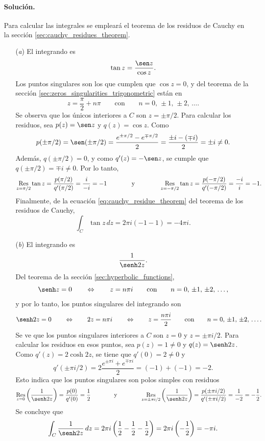 \documentclass[a4paper]{report}
\def\Res{\qopname\relax m{Res}}
\begin{document}
\paragraph{Solución.}

Para calcular las integrales se empleará el teorema de los residuos de Cauchy en la sección \ref{sec:cauchy_residues_theorem}.

\begin{enumerate}
 \item[(\textit{a})] El integrando es
 \[
  \tan z=\frac{\sen z}{\cos z}.
 \]
 Los puntos singulares son los que cumplen que \(\cos z=0\), y del teorema de la sección \ref{sec:zeros_singularities_trigonometric} están en
 \[
  z=\frac{\pi}{2}+n\pi
  \qquad\textrm{con}\qquad 
  n=0,\,\pm1,\,\pm2,\,\dots.
 \]
 Se observa que los únicos interiores a \(C\) son \(z=\pm\pi/2\). Para calcular los residuos, sea \(p(z)=\sen z\) y \(q(z)=\cos z\).
 Como
 \[
  p(\pm\pi/2)=\sen(\pm\pi/2)=\frac{e^{\pm\pi/2}-e^{\mp\pi/2}}{2}=\frac{\pm i-(\mp i)}{2}=\pm i\neq0.
 \]
 Además, \(q(\pm\pi/2)=0\), y como \(q'(z)=-\sen z\), se cumple que \(q(\pm\pi/2)=\mp i\neq0\). Por lo tanto,
 \[
  \Res_{z=\pi/2}\tan z=\frac{p(\pi/2)}{q'(\pi/2)}=\frac{i}{-i}=-1
  \qquad\qquad\textrm{y}\qquad\qquad 
  \Res_{z=-\pi/2}\tan z=\frac{p(-\pi/2)}{q'(-\pi/2)}=\frac{-i}{i}=-1.  
 \]
 Finalmente, de la ecuación \ref{eq:cauchy_residue_theorem} del teorema de los residuos de Cauchy,
 \[
  \int_C\tan z\,dz=2\pi i(-1-1)=-4\pi i.
 \]
 \item[(\textit{b})] El integrando es
 \[
  \frac{1}{\senh2z}.
 \]
 Del teorema de la sección \ref{sec:hyperbolic_functions}, 
\[
 \senh z=0
 \qquad\Leftrightarrow\qquad
 z=n\pi i
 \qquad\textrm{con}\qquad 
 n=0,\,\pm1,\,\pm2,\,\dots,
\]
y por lo tanto, los puntos singulares del integrando son
\[
 \senh 2z=0
 \qquad\Leftrightarrow\qquad
 2z=n\pi i
 \qquad\Leftrightarrow\qquad
 z=\frac{n\pi i}{2}
 \qquad\textrm{con}\qquad 
 n=0,\,\pm1,\,\pm2,\,\dots.
\]
Se ve que los puntos singulares interiores a \(C\) son \(z=0\) y \(z=\pm\pi i/2\). Para calcular los residuos en esos puntos, sea \(p(z)=1\neq0\) y \(q(z)=\senh2z\). Como \(q'(z)=2\cosh2z\), se tiene que 
\(q'(0)=2\neq0\) y 
\[
 q'(\pm\pi i/2)=2\frac{e^{\pm\pi i}+e^{\mp\pi i}}{2}=(-1)+(-1)=-2.
\]
Esto indica que los puntos singulares son polos simples con residuos
\[
 \Res_{z=0}\left(\frac{1}{\senh2z}\right)=\frac{p(0)}{q'(0)}=\frac{1}{2}
 \qquad\qquad\textrm{y}\qquad\qquad
 \Res_{z=\pm\pi i/2}\left(\frac{1}{\senh2z}\right)=\frac{p(\pm\pi i/2)}{q'(\pm\pi i/2)}=\frac{1}{-2}=-\frac{1}{2}.
\]
Se concluye que 
\[
 \int_C\frac{1}{\senh 2z}\,dz=2\pi i\left(\frac{1}{2}-\frac{1}{2}-\frac{1}{2}\right)=2\pi i\left(-\frac{1}{2}\right)=-\pi i.
\]
\end{enumerate} 
 
\end{document}

